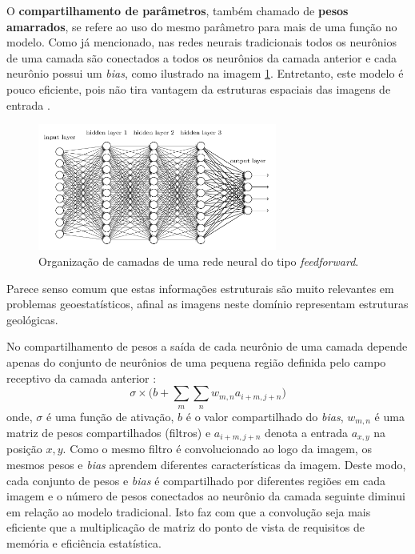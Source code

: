 O \textbf{compartilhamento de parâmetros}, também chamado de \textbf{pesos amarrados},
se refere ao uso do mesmo parâmetro para mais de uma função no modelo.
Como já mencionado, nas redes neurais tradicionais todos os neurônios de uma camada são conectados a todos os neurônios
da camada anterior e cada neurônio possui um \textit{bias}, como ilustrado na imagem \ref{fig:shallow}.
Entretanto, este modelo é pouco eficiente, pois não tira vantagem da estruturas espaciais das imagens
de entrada \citep{Gdfl16}.
\begin{figure}[htp]
\begin{center}
  \includegraphics[width=0.7\textwidth]{fig/shallow_nn}
  \caption{Organização de camadas de uma rede neural do tipo \textit{feedforward}. \citep{Nielson15}}
  \label{fig:shallow}
\end{center}
\end{figure}
Parece senso comum que estas informações estruturais são muito relevantes em problemas geoestatísticos, afinal as imagens
neste domínio representam estruturas geológicas.

No compartilhamento de pesos a saída de cada neurônio
de uma camada depende apenas do conjunto de neurônios de uma pequena região definida pelo campo receptivo da camada anterior \citep{Nielson15}:
\begin{equation}
 {\sigma} \times \bigg( b + \sum_{m}\sum_{n}{w_{m,n}a_{i+m,j+n} \bigg) }
\end{equation}
onde, $\sigma$ é uma função de ativação, $b$ é o valor compartilhado do \textit{bias}, $w_{m,n}$ é
uma matriz de pesos compartilhados (filtros) e $a_{i+m,j+n}$ denota a entrada $a_{x,y}$ na posição
$x,y$. Como o mesmo filtro é convolucionado ao logo da imagem,
os mesmos pesos e \textit{bias} aprendem diferentes características da imagem. Deste modo, cada conjunto de pesos e \textit{bias} é compartilhado
por diferentes regiões em cada imagem e o número de pesos conectados ao neurônio
da camada seguinte diminui em relação ao modelo tradicional. Isto faz com que a convolução seja mais eficiente que a multiplicação de matriz
do ponto de vista de requisitos de memória e eficiência estatística.

